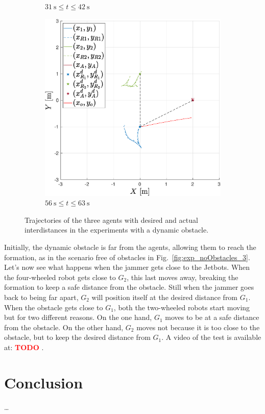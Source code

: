 \documentclass{ifacconf}
\newcommand{\TODO}[1]{
\textcolor{red}{\textbf{TODO} #1}
}
\begin{document}
\begin{figure}
\begin{subfigure}[b]{0.32\columnwidth}
         \caption{$\SI{31}{\second} \leq  t \leq \SI{42}{\second}$}
         \label{fig:exp_dynamicObstacles_2}
    \end{subfigure}
    \begin{subfigure}[b]{0.32\columnwidth}
        \centering
        \includegraphics[width=\linewidth]{images/experiment/dynamic_obstacles/dynamicObst_exp_closeR1_bigger.eps}
        \caption{$\SI{56}{\second} \leq  t \leq \SI{63}{\second}$}
        \label{fig:exp_dynamicObstacles_3}
    \end{subfigure}
    \vspace{-0.2cm}
    \caption{Trajectories of the three agents with desired and actual interdistances 
   in the experiments with a dynamic obstacle.}
    \label{fig:exp_dynamicObstacles}
\end{figure}
Initially, the dynamic obstacle is far from the agents,
allowing them to reach 
the formation, as in the scenario free of obstacles 
in Fig.~\ref{fig:exp_noObstacles_3}.
Let's now see what happens when the jammer gets close to the Jetbots.
When the four-wheeled robot gets close to $G_2$, this last moves away, 
breaking the formation to keep a safe distance from the obstacle.
Still when the jammer goes back to being far apart, 
$G_2$ will position itself at the desired distance from $G_1$.
When the obstacle gets close to $G_1$, both the two-wheeled 
robots start moving but for two different reasons.
On the one hand, $G_1$ moves to be at a safe distance from the obstacle.
On the other hand, $G_2$ moves not because it is too close to the obstacle, 
but to keep the desired distance from $G_1$.
A video of the test is available at:\TODO{}.

\section{Conclusion}
\label{sec:conclusion}

\dots

\end{document}
